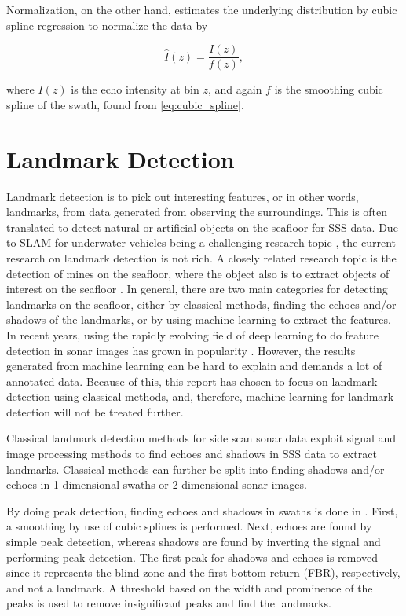 Normalization, on the other hand, estimates the underlying distribution by cubic spline regression to normalize the data by

\begin{equation}
    \hat{I}(z) = \frac{I(z)}{f(z)},
    \label{eq:swath_norm}
\end{equation}

where $I(z)$ is the echo intensity at bin $z$, and again $f$ is the smoothing cubic spline of the swath, found from \cref{eq:cubic_spline}.

\section{Landmark Detection}

Landmark detection is to pick out interesting features, or in other words, landmarks, from data generated from observing the surroundings. This is often translated to detect natural or artificial objects on the seafloor for SSS data. Due to SLAM for underwater vehicles being a challenging research topic \cite{Hidalgo2015ReviewTechniques}, the current research on landmark detection is not rich. A closely related research topic is the detection of mines on the seafloor, where the object also is to extract objects of interest on the seafloor \cite{Picard2016DetectionDimensionality}. In general, there are two main categories for detecting landmarks on the seafloor, either by classical methods, finding the echoes and/or shadows of the landmarks, or by using machine learning to extract the features. In recent years, using the rapidly evolving field of deep learning to do feature detection in sonar images has grown in popularity \cite{Wang2020ImageSonar} \cite{Zhou2022NonlinearFeatures}. However, the results generated from machine learning can be hard to explain and demands a lot of annotated data. Because of this, this report has chosen to focus on landmark detection using classical methods, and, therefore, machine learning for landmark detection will not be treated further.

Classical landmark detection methods for side scan sonar data exploit signal and image processing methods to find echoes and shadows in SSS data to extract landmarks. Classical methods can further be split into finding shadows and/or echoes in 1-dimensional swaths or 2-dimensional sonar images.

By doing peak detection, finding echoes and shadows in swaths is done in \cite{Al-Rawi2017LandmarkImages}. First, a smoothing by use of cubic splines is performed. Next, echoes are found by simple peak detection, whereas shadows are found by inverting the signal and performing peak detection. The first peak for shadows and echoes is removed since it represents the blind zone and the first bottom return (FBR), respectively, and not a landmark. A threshold based on the width and prominence of the peaks is used to remove insignificant peaks and find the landmarks.  

